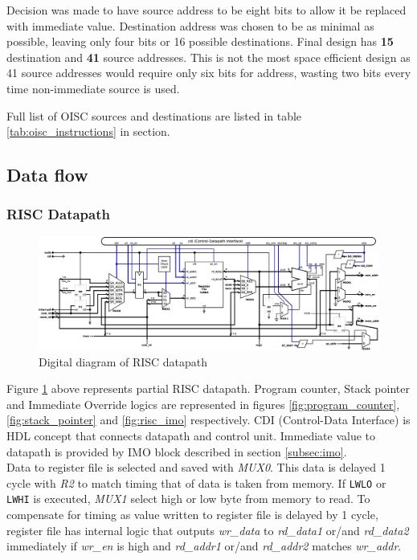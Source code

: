 Decision was made to have source address to be eight bits to allow it be replaced with immediate value. Destination address was chosen to be as minimal as possible, leaving only four bits or 16 possible destinations. Final design has \textbf{15} destination and \textbf{41} source addresses. This is not the most space efficient design as 41 source addresses would require only six bits for address, wasting two bits every time non-immediate source is used.

Full list of OISC sources and destinations are listed in table \ref{tab:oisc_instructions} in  section.

\subsection{Data flow} \label{sec:dataflow}
\begin{landscape}
	\subsubsection{RISC Datapath} \label{subsec:datapath}
	\begin{figure}[h!]
		\centering
		\includegraphics[width=\linewidth]{../resources/datapath.eps}
		\caption{Digital diagram of RISC datapath}
		\label{fig:datapath}	
	\end{figure}
	
	Figure \ref{fig:datapath} above represents partial RISC datapath. Program counter, Stack pointer and Immediate Override logics are represented in figures \ref{fig:program_counter}, \ref{fig:stack_pointer} and \ref{fig:risc_imo} respectively. CDI (Control-Data Interface) is HDL concept that connects datapath and control unit. Immediate value to datapath is provided by IMO block described in section \ref{subsec:imo}.\\
	Data to register file is selected and saved with \textit{MUX0}. This data is delayed 1 cycle with \textit{R2} to match timing that of data is taken from memory. If \texttt{LWLO} or \texttt{LWHI} is executed, \textit{MUX1} select high or low byte from memory to read. To compensate for timing as value written to register file is delayed by 1 cycle, register file has internal logic that outputs \textit{wr\_data} to \textit{rd\_data1} or/and  \textit{rd\_data2} immediately if \textit{wr\_en} is high and \textit{rd\_addr1} or/and \textit{rd\_addr2} matches \textit{wr\_addr}.\\
\end{landscape}


